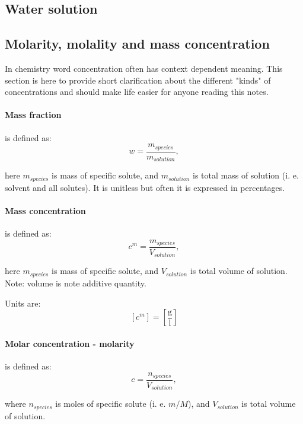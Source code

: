 \subsection{Water solution}

\subsection{Molarity, molality and mass concentration}

In chemistry word concentration often has context dependent meaning. This section is here to provide short clarification about the different "kinds" of concentrations and should make life easier for anyone reading this notes.

\paragraph*{Mass fraction}
is defined as:
\begin{equation}\label{eq:defMassFrac}
    w = \frac{m_{species}}{m_{solution}},
\end{equation}

here $m_{species}$ is mass of specific solute, and $m_{solution}$ is total mass of solution (i. e. solvent and all solutes). It is unitless but often it is expressed in percentages.

\paragraph*{Mass concentration}
is defined as:
\begin{equation}\label{eq:defMassConc}
    c^{m} = \frac{m_{species}}{V_{solution}},
\end{equation}

here $m_{species}$ is mass of specific solute, and $V_{solution}$ is total volume of solution. Note: volume is note additive quantity.

Units are:
\[\left[c^{m}\right]=\left[\frac{\text{g}}{\text{l}}\right]\]

\paragraph*{Molar concentration - molarity}
is defined as:
\begin{equation}\label{eq:defMolarConc}
    c = \frac{n_{species}}{V_{solution}},
\end{equation}

where $n_{species}$ is moles of specific solute (i. e. $m/M$), and $V_{solution}$ is total volume of solution.


